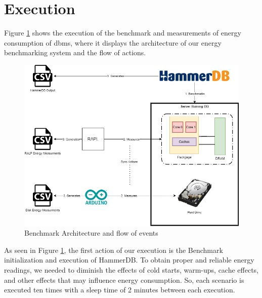 \section{Execution}
\label{sc:execution}





Figure \ref{fig:arch} shows the execution of the benchmark and measurements of energy consumption of \gls{dbms}, where it displays the architecture of our energy benchmarking system and the flow of actions.



\begin{figure}[H]
  \centering
  \includegraphics[width=\linewidth]{Chapters/images/arquitetura.png}
      \caption{Benchmark Architecture and flow of events}
  \label{fig:arch}
\end{figure}




As seen in Figure \ref{fig:arch}, the first action of our execution is the Benchmark initialization and execution of HammerDB. To obtain proper and reliable energy readings, we needed to diminish the effects of cold starts, warm-ups, cache effects, and other effects that may influence energy consumption. So, each scenario is executed ten times with a sleep time of 2 minutes between each execution.



